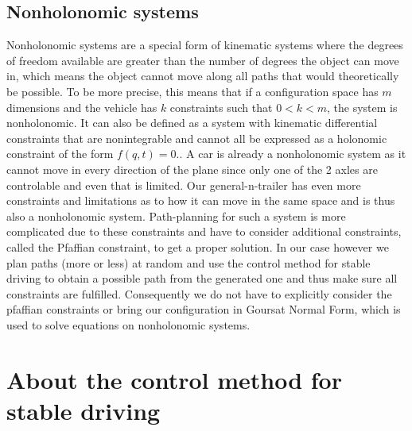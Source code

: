 
\subsection{Nonholonomic systems}
\label{sec:nonholonomic_systems}

Nonholonomic systems are a special form of kinematic systems where the degrees of freedom available are greater than the number of degrees the object can move in, which means the object cannot move along all paths that would theoretically be possible. To be more precise, this means that if a configuration space has $m$ dimensions and the vehicle has $k$ constraints such that $0<k<m$, the system is nonholonomic. It can also be defined as a system with kinematic differential constraints that are nonintegrable and cannot all be expressed as a holonomic constraint of the form $f(q,t)=0$.\cite{29,30}. A car is already a nonholonomic system as it cannot move in every direction of the plane since only one of the 2 axles are controlable and even that is limited. Our general-n-trailer has even more constraints and limitations as to how it can move in the same space and is thus also a nonholonomic system. Path-planning for such a system is more complicated due to these constraints and have to consider additional constraints, called the Pfaffian constraint, to get a proper solution. 
In our case however we plan paths (more or less) at random and use the control method for stable driving to obtain a possible path from the generated one and thus make sure all constraints are fulfilled. Consequently we do not have to explicitly consider the pfaffian constraints or bring our configuration in Goursat Normal Form, which is used to solve equations on nonholonomic systems.

\section{About the control method for stable driving}
\label{sec:about_control_method}

